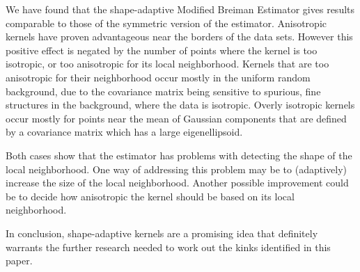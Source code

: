 
We have found that the shape-adaptive Modified Breiman Estimator gives results comparable to those of the symmetric version of the estimator.
Anisotropic kernels have proven advantageous near the borders of the data sets. However this positive effect is negated by the number of points where the kernel is too isotropic, or too anisotropic for its local neighborhood.
	Kernels that are too anisotropic for their neighborhood occur mostly in the uniform random background, due to the covariance matrix being sensitive to spurious, fine structures in the background, where the data is isotropic.
	Overly isotropic kernels occur mostly for points near the mean of Gaussian components that are defined by a covariance matrix which has a large eigenellipsoid.

Both cases show that the estimator has problems with detecting the shape of the local neighborhood. One way of addressing this problem may be to (adaptively) increase the size of the local neighborhood. Another possible improvement could be to decide how anisotropic the kernel should be based on its local neighborhood.

In conclusion, shape-adaptive kernels are a promising idea that definitely warrants the further research needed to work out the kinks identified in this paper.